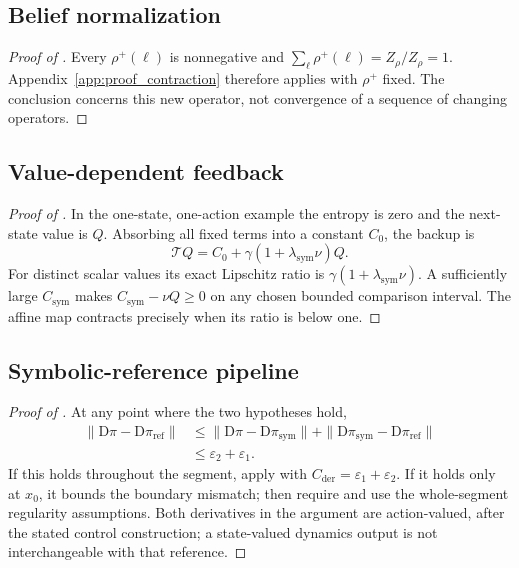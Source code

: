 \subsection{Belief normalization}
\label{app:proof_belief}

\begin{proof}[Proof of ]
Every \(\rho^+(\ell)\) is nonnegative and
\(\sum_\ell\rho^+(\ell)=Z_\rho/Z_\rho=1\).
Appendix~\ref{app:proof_contraction} therefore applies with \(\rho^+\) fixed.
The conclusion concerns this new operator, not convergence of a sequence of changing operators.
\end{proof}

\subsection{Value-dependent feedback}
\label{app:proof_feedback}

\begin{proof}[Proof of ]
In the one-state, one-action example the entropy is zero and the next-state value is \(Q\). Absorbing all fixed terms into a constant \(C_0\), the backup is
\[
\mathcal T Q=C_0+\gamma(1+\lambda_{\mathrm{sym}}\nu)Q.
\]
For distinct scalar values its exact Lipschitz ratio is
\(\gamma(1+\lambda_{\mathrm{sym}}\nu)\).
A sufficiently large \(C_{\mathrm{sym}}\) makes
\(C_{\mathrm{sym}}-\nu Q\geq0\) on any chosen bounded comparison interval.
The affine map contracts precisely when its ratio is below one.
\end{proof}

\subsection{Symbolic-reference pipeline}
\label{app:proof_symbolic}

\begin{proof}[Proof of ]
At any point where the two hypotheses hold,
\[
\begin{split}
\|\mathrm D\pi-\mathrm D\pi_{\mathrm{ref}}\|
&\leq\|\mathrm D\pi-\mathrm D\pi_{\mathrm{sym}}\|
+\|\mathrm D\pi_{\mathrm{sym}}-\mathrm D\pi_{\mathrm{ref}}\|\\
&\leq\varepsilon_2+\varepsilon_1.
\end{split}
\]
If this holds throughout the segment, apply 
with \(C_{\mathrm{der}}=\varepsilon_1+\varepsilon_2\).
If it holds only at \(x_0\), it bounds the boundary mismatch;
 then require and use the whole-segment regularity assumptions.
Both derivatives in the argument are action-valued, after the stated control construction; a state-valued dynamics output is not interchangeable with that reference.
\end{proof}


